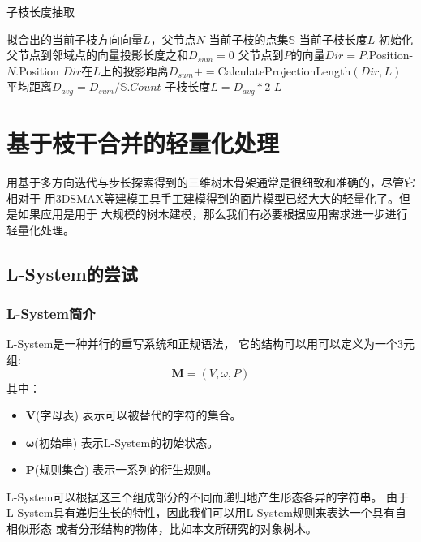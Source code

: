 \begin{algorithm}[H]
	\caption{子枝长度抽取}
	\label{alg:length}
	\begin{algorithmic}[1] 
		\Require 拟合出的当前子枝方向向量$L$，父节点$N$
		\Require 当前子枝的点集$\mathbb{S}$
		\Ensure 当前子枝长度$L$
		\State 初始化父节点到邻域点的向量投影长度之和$D_{sum}=0$
		\State 父节点到$P$的向量$Dir=P$.Position-$N$.Position
		\State $Dir$在$L$上的投影距离$D_{sum}+=$CalculateProjectionLength$(Dir, L)$
		\EndFor
		\State 平均距离$D_{avg}=D_{sum}/\mathbb{S}.Count$
		\State 子枝长度$L=D_{avg}*2$
		\State \Return $L$
	\end{algorithmic}
\end{algorithm}

\clearpage
\section{基于枝干合并的轻量化处理}
\label{sec:branchcombine}
用基于多方向迭代与步长探索得到的三维树木骨架通常是很细致和准确的，尽管它相对于
用3DSMAX等建模工具手工建模得到的面片模型已经大大的轻量化了。但是如果应用是用于
大规模的树木建模，那么我们有必要根据应用需求进一步进行轻量化处理。

\subsection{L-System的尝试}
\label{subsec:lsystem}

\subsubsection{L-System简介}
L-System是一种并行的重写系统和正规语法，
它的结构可以用可以定义为一个3元组:\\
\[\mathbf{M} = (V, \omega, P)\]
其中：\\
\begin{itemize}
	\item $\mathbf{V}$(字母表) 表示可以被替代的字符的集合。
	\item $\mathbf{\omega}$(初始串) 表示L-System的初始状态。
	\item $\mathbf{P}$(规则集合) 表示一系列的衍生规则。
\end{itemize}
L-System可以根据这三个组成部分的不同而递归地产生形态各异的字符串。
由于L-System具有递归生长的特性，因此我们可以用L-System规则来表达一个具有自相似形态
或者分形结构的物体，比如本文所研究的对象\raisebox{0.5mm}{------}树木。

